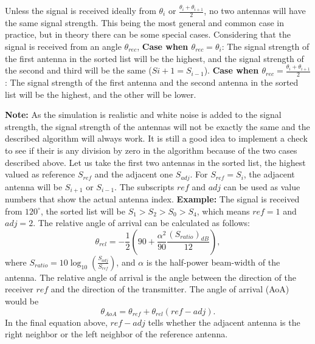 \documentclass{ifacconf}
\begin{document}
\begin{lem}
Unless the signal is received ideally from $\theta_i$ or $\frac{\theta_i + \theta_{i + 1}}{2}$, no two antennas will have the same signal strength. This being the most general and common case in practice, but in theory there can be some special cases. Considering that the signal is received from an angle $\theta_{rec}$,
\textbf{Case when $\theta_{rec} = \theta_i$}: The signal strength of the first antenna in the sorted list will be the highest, and the signal strength of the second and third will be the same ($S{i + 1} = S_{i - 1}$).
\textbf{Case when $\theta_{rec} = \frac{\theta_i + \theta_{i + 1}}{2}$}: The signal strength of the first antenna and the second antenna in the sorted list will be the highest, and the other will be lower.
\end{lem}
\textbf{Note:} As the simulation is realistic and white noise is added to the signal strength, the signal strength of the antennas will not be exactly the same and the described algorithm will always work. It is still a good idea to implement a check to see if their is any division by zero in the algorithm because of the two cases described above. 
Let us take the first two antennas in the sorted list, the highest valued as reference $S_{ref}$ and the adjacent one $S_{adj}$. For $S_{ref} = S_{i}$, the adjacent antenna will be $S_{i + 1}$ or $S_{i - 1}$. The subscripts $ref$ and $adj$ can be used as value numbers that show the actual antenna index.
\textbf{Example:} The signal is received from $120^{\circ}$, the sorted list will be $S_1 > S_2 > S_0 > S_4$, which means $ref = 1$ and $adj = 2$. 
The relative angle of arrival can be calculated as follows:
\begin{equation}
    \theta_{rel} = -\frac{1}{2} (90 + \frac{\alpha^2}{90} \frac{(S_{ratio})_{dB}}{12}),
    \label{eq:rel}
\end{equation}
where $S_{ratio} = 10 \log_{10}(\frac{S_{adj}}{S_{ref}})$, and $\alpha$ is the half-power beam-width of the antenna. The relative angle of arrival is the angle between the direction of the receiver $ref$ and the direction of the transmitter. The angle of arrival (AoA) would be
\begin{equation}
    \theta_{AoA} = \theta_{ref} + \theta_{rel}(ref - adj).
    \label{eq:aoa}
\end{equation}
In the final equation above, $ref - adj$ tells whether the adjacent antenna is the right neighbor or the left neighbor of the reference antenna.  
\end{document}
